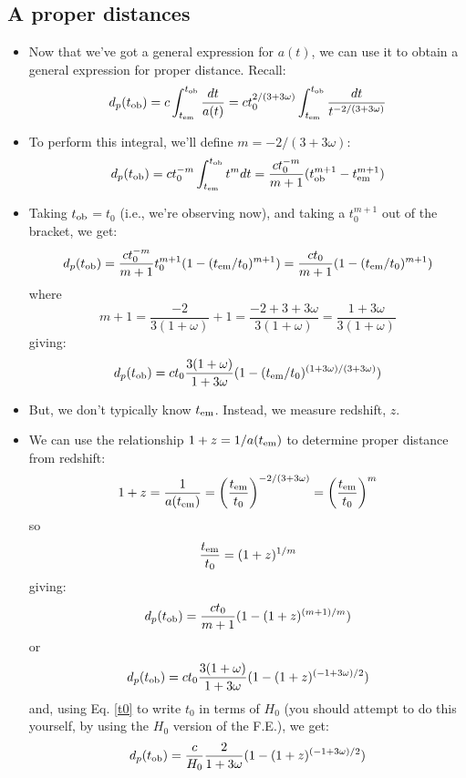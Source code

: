 \documentclass[11pt]{article}
\newcommand{\tem}{\ensuremath{t_{\rm em}}}
\newcommand{\tob}{\ensuremath{t_{\rm ob}}}
\begin{document}
\subsection{A proper distances}
\begin{itemize}
\item Now that we've got a general expression for $a(t)$, we can use it to obtain a general expression for proper distance. Recall:
\begin{equation} 
d_p(t_{\rm ob}) = c\int_{\tem}^{\tob}\frac{dt}{a(t)} = ct_0^{2/(3+3\omega)}\int_{\tem}^{\tob}\frac{dt}{t^{-2/(3+3\omega)}}
\end{equation}
\item To perform this integral, we'll define $m=-2/(3+3\omega)$:
\begin{equation}
d_p(t_{\rm ob}) = ct_0^{-m}\int_{\tem}^{\tob}t^m dt = \frac{ct_0^{-m}}{m+1}(\tob^{m+1} - \tem^{m+1})
\end{equation}
\item Taking \tob$=t_0$ (i.e., we're observing now), and taking a $t_0^{m+1}$ out of the bracket, we get: 
\begin{equation}
    d_p(t_{\rm ob}) = \frac{ct_0^{-m}}{m+1}t_0^{m+1}(1 - (\tem/t_0)^{m+1}) = \frac{ct_0}{m+1}(1 - (\tem/t_0)^{m+1})
\end{equation}
where
\begin{equation}
m+1 = \frac{-2}{3(1+\omega)} + 1 = \frac{-2 + 3 + 3\omega}{3(1+\omega)} = \frac{1+3\omega}{3(1+\omega)}
\end{equation}
giving:
\begin{equation}
    d_p(t_{\rm ob}) = ct_0\frac{3(1+\omega)}{1+3\omega}(1 - (\tem/t_0)^{(1+3\omega)/(3+3\omega)})
\end{equation}    
\item But, we don't typically know \tem. Instead, we measure redshift, $z$.
\item We can use the relationship $1 + z = 1/a(\tem)$ to determine proper distance from redshift:
\begin{equation}
1+z = \frac{1}{a(\tem)} = \left(\frac{\tem}{t_0}\right)^{-2/(3+3\omega)} = \left(\frac{\tem}{t_0}\right)^m
\end{equation}
so
\begin{equation}
    \frac{\tem}{t_0} = (1+z)^{1/m}
\end{equation}
giving:
\begin{equation}
    d_p(t_{\rm ob}) = \frac{ct_0}{m+1}(1 - (1+z)^{(m+1)/m})
\end{equation}
or
\begin{equation}
    d_p(t_{\rm ob}) = ct_0\frac{3(1+\omega)}{1+3\omega}(1 - (1+z)^{(-1+3\omega)/2})
\end{equation}
and, using Eq. \ref{t0} to write $t_0$ in terms of $H_0$ (you should attempt to do this yourself, by using the $H_0$ version of the F.E.), we get:
\begin{equation}
    d_p(t_{\rm ob}) = \frac{c}{H_0}\frac{2}{1+3\omega}(1 - (1+z)^{(-1+3\omega)/2})
\end{equation}


\end{itemize}
\end{document}
